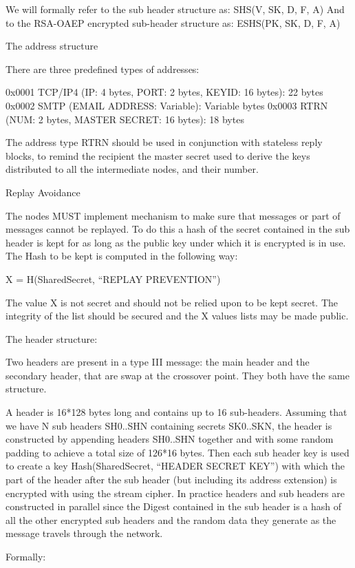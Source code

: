 We will formally refer to the sub header structure as:
SHS(V, SK, D, F, A)
And to the RSA-OAEP encrypted sub-header structure as:
ESHS(PK, SK, D, F, A)

The address structure

There are three predefined types of addresses:

0x0001 TCP/IP4 (IP: 4 bytes, PORT: 2 bytes, KEYID: 16 bytes): 22 bytes
0x0002 SMTP   (EMAIL ADDRESS: Variable): Variable bytes
0x0003 RTRN   (NUM: 2 bytes, MASTER SECRET: 16 bytes): 18 bytes

The address type RTRN should be used in conjunction with stateless
reply blocks, to remind the recipient the master secret used to
derive the keys distributed to all the intermediate nodes, and their
number.

Replay Avoidance

The nodes MUST implement mechanism to make sure that messages or part
of messages cannot be replayed. To do this a hash of the secret
contained in the sub header is kept for as long as the public key
under which it is encrypted is in use. The Hash to be kept is computed
in the following way:

X = H(SharedSecret, ``REPLAY PREVENTION'')

The value X is not secret and should not be relied upon to be kept
secret. The integrity of the list should be secured and the X values
lists may be made public.

The header structure:

Two headers are present in a type III message: the main header and the
secondary header, that are swap at the crossover point. They both have
the same structure. 

A header is 16*128 bytes long and contains up to 16
sub-headers. Assuming that we have N sub headers SH0..SHN containing
secrets SK0..SKN, the header is constructed by appending headers
SH0..SHN together and with some random padding to achieve a total size
of 126*16 bytes. Then each sub header key is used to create a key
Hash(SharedSecret, ``HEADER SECRET KEY'') with which the part of the
header after the sub header (but including its address extension) is
encrypted with using the stream cipher. 
In practice headers and sub headers are constructed in parallel since
the Digest contained in the sub header is a hash of all the other
encrypted sub headers and the random data they generate as the message
travels through the network. 

Formally:

